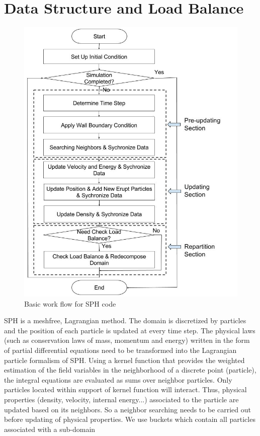 \documentclass[conference,compsoc]{IEEEtran}
\begin{document}
\section{Data Structure and Load Balance}
\begin{figure}[!t]
\centering
\includegraphics[scale=0.33]{Work_flow}
\caption{Basic work flow for SPH code}
\label{fig:Work_flow}
\end{figure}
SPH is a meshfree, Lagrangian method. The domain is discretized by particles and the position of each particle is updated at every time step. The physical laws (such as conservation laws of mass, momentum and energy) written in the form of partial differential equations need to be transformed into the Lagrangian particle formalism of SPH. Using a kernel function that provides the weighted estimation of the field variables in the neighborhood of a discrete point (particle), the integral equations are evaluated as sums over neighbor particles. Only particles located within support of kernel function will interact. Thus, physical properties (density, velocity, internal energy...) associated to the particle are updated based on its neighbors. So a neighbor searching needs to be carried out before updating of physical properties. We use buckets which contain all particles associated with a sub-domain 
\end{document}
